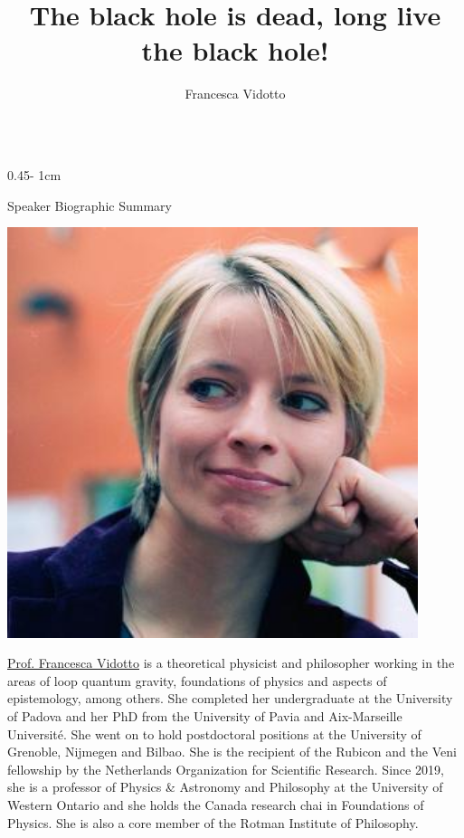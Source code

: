 \documentclass{../psuposter}
\title{The black hole is dead, long live the black hole!}
\author{Francesca Vidotto}
\institute{University of Western Ontario, Canada}
\begin{document}
\begin{frame}
\begin{columns}[t, totalwidth=\textwidth]
\begin{column}{0.45\textwidth - 1cm}


    \begin{block}{Speaker Biographic Summary}
    	\begin{center}
    		\includegraphics[width=0.9\textwidth]{images/portrait}
    	\end{center}
    	\href{https://www.uwo.ca/philosophy/people/vidotto.html}{Prof. Francesca Vidotto} is a theoretical physicist and philosopher working in the areas of loop quantum gravity, foundations of physics and aspects of epistemology, among others. She completed her undergraduate at the University of Padova and her PhD from the University of Pavia and Aix-Marseille Université. She went on to hold postdoctoral positions at the University of Grenoble, Nijmegen and Bilbao. She is the recipient of the Rubicon and the Veni fellowship by the Netherlands Organization for Scientific Research. Since 2019, she is a professor of Physics \& Astronomy and Philosophy at the University of Western Ontario and she holds the Canada research chai in Foundations of Physics. She is also a core member of the Rotman Institute of Philosophy.
    \end{block}



\end{column}
\end{columns}
\end{frame}
\end{document}
